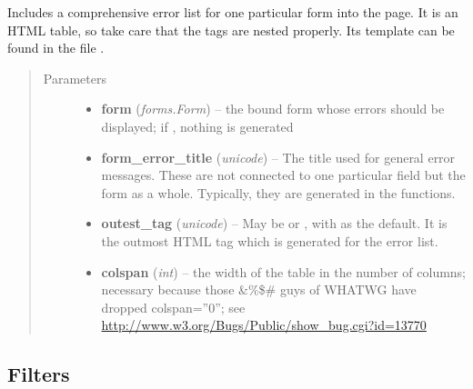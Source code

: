 \documentclass[a4paper,11pt,english]{sphinxmanual}
\begin{document}

\begin{fulllineitems}
\label{programming/template_tags_and_filters:jb_common.templatetags.juliabase.error_list}
Includes a comprehensive error list for one particular form into the
page.  It is an HTML table, so take care that the tags are nested
properly.  Its template can be found in the file .
\begin{quote}\begin{description}
\item[{Parameters}] \leavevmode\begin{itemize}
\item {} 
\textbf{form} (\emph{forms.Form}) -- the bound form whose errors should be displayed; if ,
nothing is generated

\item {} 
\textbf{form\_error\_title} (\emph{unicode}) -- The title used for general error messages.  These
are not connected to one particular field but the form as a
whole. Typically, they are generated in the 
functions.

\item {} 
\textbf{outest\_tag} (\emph{unicode}) -- May be  or , with  as
the default.  It is the outmost HTML tag which is generated for the
error list.

\item {} 
\textbf{colspan} (\emph{int}) -- the width of the table in the number of columns; necessary
because those \&\%\$\# guys of WHATWG have dropped colspan=''0''; see
\href{http://www.w3.org/Bugs/Public/show\_bug.cgi?id=13770}{http://www.w3.org/Bugs/Public/show\_bug.cgi?id=13770}

\end{itemize}

\end{description}\end{quote}

\end{fulllineitems}



\subsection{Filters}
\label{programming/template_tags_and_filters:filters}
\end{document}
